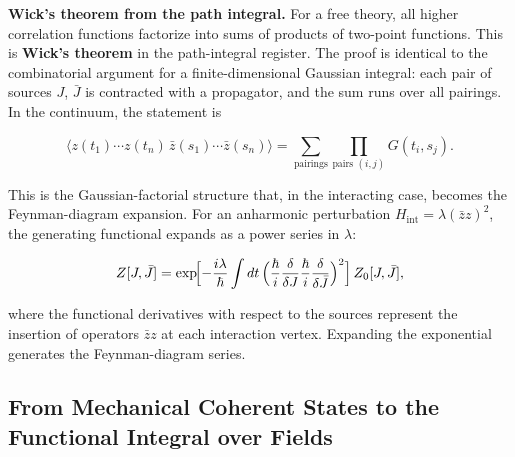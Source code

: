 \medskip\noindent\textbf{Wick's theorem from the path integral.} For a free theory, all higher correlation functions factorize into sums of products of two-point functions. This is \textbf{Wick's theorem} in the path-integral register. The proof is identical to the combinatorial argument for a finite-dimensional Gaussian integral: each pair of sources $J$, $\bar J$ is contracted with a propagator, and the sum runs over all pairings. In the continuum, the statement is
\begin{linenomath}
\begin{equation}
\langle z(t_{1})\cdots z(t_{n})\,\bar z(s_{1})\cdots\bar z(s_{n})\rangle
= \sum_{\text{pairings}} \prod_{\text{pairs }(i,j)} G(t_{i}, s_{j}).
\label{eq:wick-theorem-path-integral}
\end{equation}
\end{linenomath}
This is the Gaussian-factorial structure that, in the interacting case, becomes the Feynman-diagram expansion. For an anharmonic perturbation $H_{\mathrm{int}} = \lambda(\bar z z)^{2}$, the generating functional expands as a power series in $\lambda$:
\begin{linenomath}
\begin{equation}
Z[J,\bar J] = \exp\!\Bigl[-\frac{i\lambda}{\hbar}\int dt\,
\Bigl(\frac{\hbar}{i}\frac{\delta}{\delta J}\frac{\hbar}{i}\frac{\delta}{\delta\bar J}\Bigr)^{2}\Bigr]\,
Z_{0}[J,\bar J],
\label{eq:interacting-generating-functional}
\end{equation}
\end{linenomath}
where the functional derivatives with respect to the sources represent the insertion of operators $\bar z z$ at each interaction vertex. Expanding the exponential generates the Feynman-diagram series.

\subsection{From Mechanical Coherent States to the Functional Integral over Fields}

